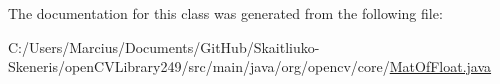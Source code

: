 The documentation for this class was generated from the following file\+:\begin{DoxyCompactItemize}
\item 
C\+:/\+Users/\+Marcius/\+Documents/\+Git\+Hub/\+Skaitliuko-\/\+Skeneris/open\+C\+V\+Library249/src/main/java/org/opencv/core/\mbox{\hyperlink{_mat_of_float_8java}{Mat\+Of\+Float.\+java}}\end{DoxyCompactItemize}
